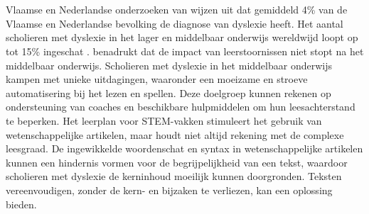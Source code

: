 \section{}%
\label{sec:probleemstelling}

Vlaamse en Nederlandse onderzoeken van \textcite{Wentink2008, Desoete2017} wijzen uit dat gemiddeld 4\% van de Vlaamse en Nederlandse bevolking de diagnose van dyslexie heeft. Het aantal scholieren met dyslexie in het lager en middelbaar onderwijs wereldwijd loopt op tot 15\% ingeschat \autocite{Bonte2020, VanDerMeer2022}. \textcite{Lissens2020} benadrukt dat de impact van leerstoornissen niet stopt na het middelbaar onderwijs. Scholieren met dyslexie in het middelbaar onderwijs kampen met unieke uitdagingen, waaronder een moeizame en stroeve automatisering bij het lezen en spellen. Deze doelgroep kunnen rekenen op ondersteuning van coaches en beschikbare hulpmiddelen om hun leesachterstand te beperken. Het leerplan voor STEM-vakken stimuleert het gebruik van wetenschappelijke artikelen, maar houdt niet altijd rekening met de complexe leesgraad. De ingewikkelde woordenschat en syntax in wetenschappelijke artikelen kunnen een hindernis vormen voor de begrijpelijkheid van een tekst, waardoor scholieren met dyslexie de kerninhoud moeilijk kunnen doorgronden. Teksten vereenvoudigen, zonder de kern- en bijzaken te verliezen, kan een oplossing bieden. 


